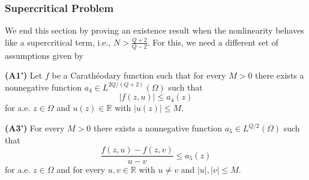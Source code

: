 \documentclass[11pt]{article}
\newcommand{\om} {\Omega}
\newcommand{\real}{\mathbb{R}}
\begin{document}
\subsubsection{Supercritical Problem}

We end this section by proving an existence result when the nonlinearity behaves like a supercritical term, i.e., $N  > \frac{Q+2}{Q-2}$. For this, we need a different set of assumptions given by

\textbf{(A1')} Let $f$ be a Carath\'{e}odary function such that for every $M>0$ there exists a nonnegative function $a_4 \in L^{2Q/(Q+2)}(\om)$ such that
\begin{equation*}
|f(z,u)| \leq a_4(z)
\end{equation*}
for a.e. $z \in \om$ and $u(z) \in \real $ with $|u(z)|\leq M$.

\textbf{(A3')} For every $M>0$ there exists a nonnegative function $a_5 \in L^{Q/2}(\om)$ such that 
\begin{equation*}
    \frac{f(z,u) - f(z,v)}{u-v} \leq a_5(z)
\end{equation*}
for a.e. $z \in \om$ and for every $u,v \in \real$ with $u\neq v$ and $|u|,|v| \leq M$. \\
\end{document}
